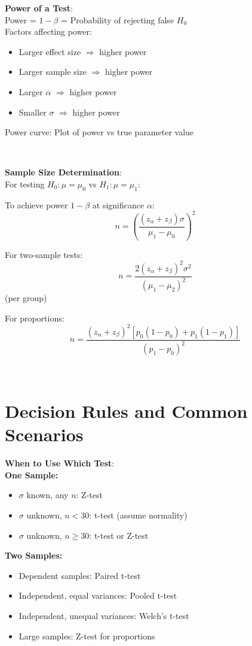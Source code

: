 \documentclass{article}
\newenvironment{cheatformula}[1][Title]{
    \begin{minipage}{\linewidth}
    \textbf{#1}:\\
}{
    \end{minipage}\\[2ex]
}
\begin{document}
\begin{multicols*}{2}
\begin{cheatformula}[Power of a Test]
    Power = $1 - \beta$ = Probability of rejecting false $H_0$\\
    
    Factors affecting power:
    \begin{itemize}
        \item Larger effect size $\Rightarrow$ higher power
        \item Larger sample size $\Rightarrow$ higher power
        \item Larger $\alpha$ $\Rightarrow$ higher power
        \item Smaller $\sigma$ $\Rightarrow$ higher power
    \end{itemize}
    
    Power curve: Plot of power vs true parameter value
\end{cheatformula}

\begin{cheatformula}[Sample Size Determination]
    For testing $H_0: \mu = \mu_0$ vs $H_1: \mu = \mu_1$:
    
    To achieve power $1-\beta$ at significance $\alpha$:
    $$n = \left(\frac{(z_\alpha + z_\beta)\sigma}{\mu_1 - \mu_0}\right)^2$$
    
    For two-sample tests:
    $$n = \frac{2(z_\alpha + z_\beta)^2\sigma^2}{(\mu_1 - \mu_2)^2}$$ (per group)
    
    For proportions:
    $$n = \frac{(z_\alpha + z_\beta)^2[p_0(1-p_0) + p_1(1-p_1)]}{(p_1 - p_0)^2}$$
\end{cheatformula}

\section{Decision Rules and Common Scenarios}

\begin{cheatformula}[When to Use Which Test]
    \textbf{One Sample:}
    \begin{itemize}
        \item $\sigma$ known, any $n$: Z-test
        \item $\sigma$ unknown, $n < 30$: t-test (assume normality)
        \item $\sigma$ unknown, $n \geq 30$: t-test or Z-test
    \end{itemize}
    
    \textbf{Two Samples:}
    \begin{itemize}
        \item Dependent samples: Paired t-test
        \item Independent, equal variances: Pooled t-test
        \item Independent, unequal variances: Welch's t-test
        \item Large samples: Z-test for proportions
    \end{itemize}
\end{cheatformula}


\end{multicols*}
\end{document}
